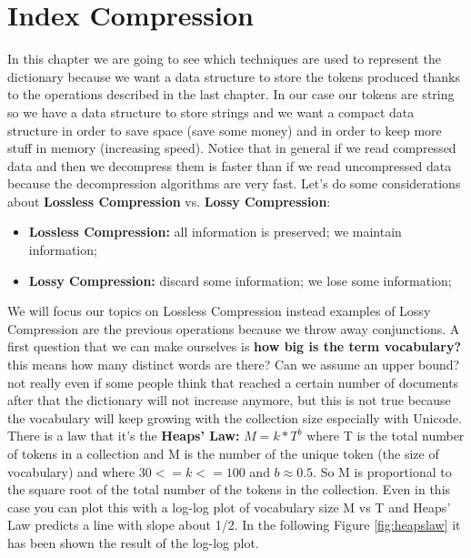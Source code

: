 \chapter{Index Compression}
In this chapter we are going to see which techniques are used to represent the dictionary because we want a data structure to store the tokens produced thanks to the operations described in the last chapter. In our case our tokens are string so we have a data structure to store strings and we want a compact data structure in order to save space (save some money) and in order to keep more stuff in memory (increasing speed). Notice that in general if we read compressed data and then we decompress them is faster than if we read uncompressed data because the decompression algorithms are very fast.\newline
Let's do some considerations about \textbf{Lossless Compression} vs. \textbf{Lossy Compression}:
\begin{itemize}
    \item \textbf{Lossless Compression:} all information is preserved; we maintain information;
    \item \textbf{Lossy Compression:} discard some information; we lose some information;
\end{itemize}
We will focus our topics on Lossless Compression instead examples of Lossy Compression are the previous operations because we throw away conjunctions.\newline
A first question that we can make ourselves is \textbf{how big is the term vocabulary?} this means how many distinct words are there? Can we assume an upper bound? not really even if some people think that reached a certain number of documents after that the dictionary will not increase anymore, but this is not true because the vocabulary will keep growing with the collection size especially with Unicode.\newline
There is a law that it's the \textbf{Heaps' Law:} $M=k*T^b$ where T is the total number of tokens in a collection and M is the number of the unique token (the size of vocabulary) and where $30 <= k <= 100$ and $b \approx 0.5$. So M is proportional to the square root of the total number of the tokens in the collection.\newline
Even in this case you can plot this with a log-log plot of vocabulary size M vs T and Heaps' Law predicts a line with slope about 1/2. In the following Figure \ref{fig:heapslaw} it has been shown the result of the log-log plot.
